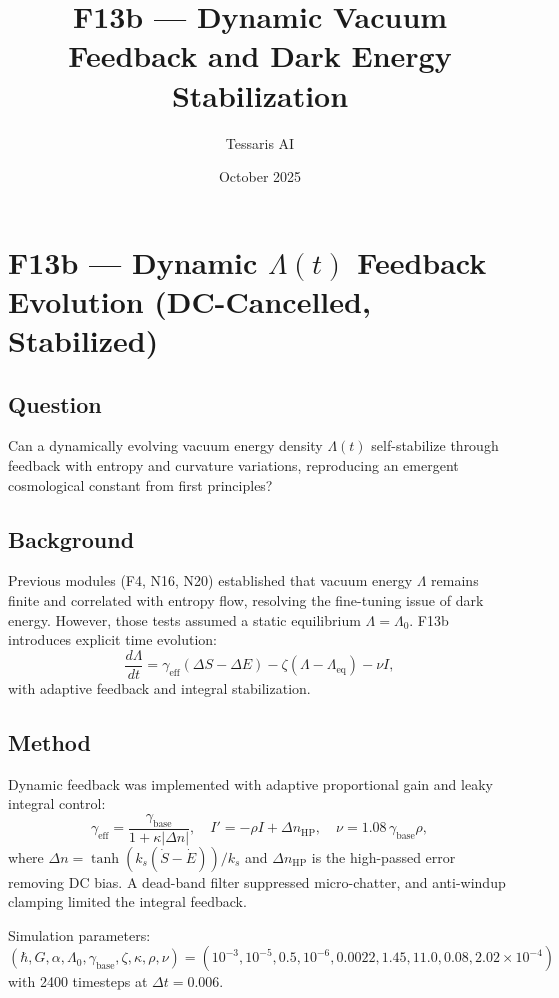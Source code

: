 \documentclass{article}
\title{F13b — Dynamic Vacuum Feedback and Dark Energy Stabilization}
\author{Tessaris AI}
\date{October 2025}
\begin{document}
\maketitle

\section*{F13b — Dynamic \(\Lambda(t)\) Feedback Evolution (DC-Cancelled, Stabilized)}

\subsection*{Question}
Can a dynamically evolving vacuum energy density \(\Lambda(t)\) self-stabilize through feedback with entropy and curvature variations, reproducing an emergent cosmological constant from first principles?

\subsection*{Background}
Previous modules (F4, N16, N20) established that vacuum energy \(\Lambda\) remains finite and correlated with entropy flow, resolving the fine-tuning issue of dark energy.
However, those tests assumed a static equilibrium \(\Lambda=\Lambda_0\).
F13b introduces explicit time evolution:
\[
\frac{d\Lambda}{dt} = \gamma_{\mathrm{eff}}(\Delta S - \Delta E)
                     - \zeta (\Lambda - \Lambda_{\mathrm{eq}})
                     - \nu I,
\]
with adaptive feedback and integral stabilization.

\subsection*{Method}
Dynamic feedback was implemented with adaptive proportional gain and leaky integral control:
\[
\gamma_{\mathrm{eff}} = 
   \frac{\gamma_{\mathrm{base}}}{1 + \kappa |\Delta n|}, \quad
I' = -\rho I + \Delta n_{\mathrm{HP}}, \quad
\nu = 1.08\,\gamma_{\mathrm{base}}\rho,
\]
where \(\Delta n = \tanh(k_s (\dot S - \dot E))/k_s\) and 
\(\Delta n_{\mathrm{HP}}\) is the high-passed error removing DC bias.
A dead-band filter suppressed micro-chatter, and anti-windup clamping limited the integral feedback.

Simulation parameters:
\[
(\hbar,G,\alpha,\Lambda_0,\gamma_{\mathrm{base}},
 \zeta,\kappa,\rho,\nu)
=(10^{-3},10^{-5},0.5,10^{-6},0.0022,1.45,11.0,0.08,2.02\times10^{-4})
\]
with 2400 timesteps at \(\Delta t=0.006\).
\end{document}
